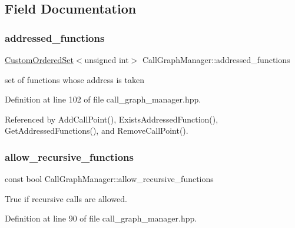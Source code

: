 \subsection{Field Documentation}
\mbox{\label{classCallGraphManager_a88ab0415905abb68305cf2ed36f85329}} 
\subsubsection{\texorpdfstring{addressed\+\_\+functions}{addressed\_functions}}
{\footnotesize\ttfamily \hyperlink{classCustomOrderedSet}{Custom\+Ordered\+Set}$<$unsigned int$>$ Call\+Graph\+Manager\+::addressed\+\_\+functions\hspace{0.3cm}{\ttfamily [private]}}



set of functions whose address is taken 



Definition at line 102 of file call\+\_\+graph\+\_\+manager.\+hpp.



Referenced by Add\+Call\+Point(), Exists\+Addressed\+Function(), Get\+Addressed\+Functions(), and Remove\+Call\+Point().

\mbox{\label{classCallGraphManager_a04e714703a5d955d0ddb00664e89467d}} 
\subsubsection{\texorpdfstring{allow\+\_\+recursive\+\_\+functions}{allow\_recursive\_functions}}
{\footnotesize\ttfamily const bool Call\+Graph\+Manager\+::allow\+\_\+recursive\+\_\+functions\hspace{0.3cm}{\ttfamily [private]}}



True if recursive calls are allowed. 



Definition at line 90 of file call\+\_\+graph\+\_\+manager.\+hpp.



